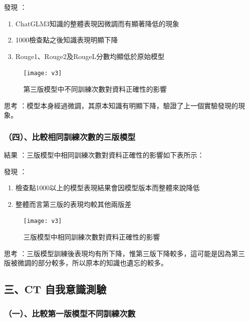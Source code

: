 \documentclass[8pt,a4paper,MingLiU,UTF8]{article}
\def\xeCJKembold{0.4}
\def\saveCJKnode{\dimen255\lastkern}
\def\restoreCJKnode{\kern-\dimen255\kern\dimen255}
\let\CJKoldsymbol\CJKsymbol
\let\CJKoldpunctsymbol\CJKpunctsymbol
\def\CJKfakeboldsymbol#1{%
	\special{pdf:literal direct 2 Tr \xeCJKembold\space w}%
	\CJKoldsymbol{#1}%
	\saveCJKnode
	\special{pdf:literal direct 0 Tr}%
	\restoreCJKnode}
\def\CJKfakeboldpunctsymbol#1{%
	\special{pdf:literal direct 2 Tr \xeCJKembold\space w}%
	\CJKoldpunctsymbol{#1}%
	\saveCJKnode
	\special{pdf:literal direct 0 Tr}%
	\restoreCJKnode}
\newcommand\CJKfakebold[1]{%
	\let\CJKsymbol\CJKfakeboldsymbol
	\let\CJKpunctsymbol\CJKfakeboldpunctsymbol
	#1%
	\let\CJKsymbol\CJKoldsymbol
	\let\CJKpunctsymbol\CJKoldpunctsymbol}
\begin{document}
	\CJKfakebold{發現}：
	
	

	\begin{enumerate}
		\item ChatGLM3知識的整體表現因微調而有顯著降低的現象
		\item 1000檢查點之後知識表現明顯下降
		\item Rouge1、Rouge2及RougeL分數均顯低於原始模型
	\end{enumerate}

\begin{figure}
	\centering
	\texttt{[image: v3]}
	\caption{第三版模型中不同訓練次數對資料正確性的影響}
\end{figure}

	\CJKfakebold{思考}：模型本身經過微調，其原本知識有明顯下降，驗證了上一個實驗發現的現象。
	
	\subsubsection{（四）、比較相同訓練次數的三版模型}
	\CJKfakebold{結果}：三版模型中相同訓練次數對資料正確性的影響如下表所示：
	
	\CJKfakebold{發現}：
	
	

	\begin{enumerate}
		\item 檢查點1000以上的模型表現結果會因模型版本而整體來說降低
		\item 整體而言第三版的表現均較其他兩版差
	\end{enumerate}

\begin{figure}
	\centering
	\texttt{[image: v3]}
	\caption{三版模型中相同訓練次數對資料正確性的影響}
\end{figure}

	\CJKfakebold{思考}：三版模型訓練後表現均有所下降，惟第三版下降較多，這可能是因為第三版被微調的部分較多，所以原本的知識也遺忘的較多。
	
	\subsection{三、CT 自我意識測驗}
	\subsubsection{（一）、比較第一版模型不同訓練次數}
\end{document}
